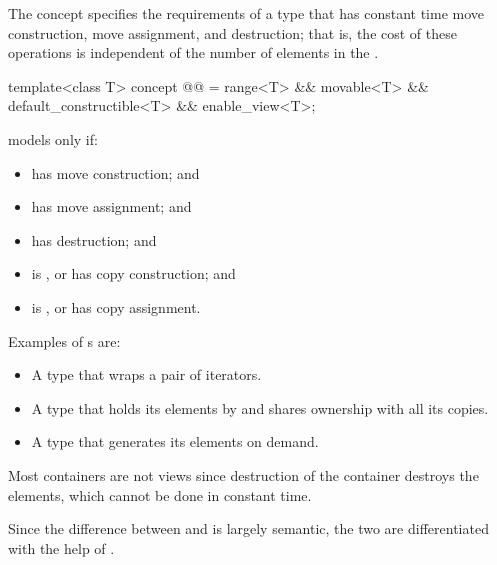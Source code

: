 \pnum
The  concept specifies the requirements of a  type
that has constant time move construction, move assignment, and destruction;
that is, the cost of these operations is
independent of the number of elements in the .

\begin{itemdecl}
template<class T>
  concept @@ =
    range<T> && movable<T> && default_constructible<T> && enable_view<T>;
\end{itemdecl}

\begin{itemdescr}
\pnum
{} models  only if:
\begin{itemize}
\item
{} has  move construction; and

\item
{} has  move assignment; and

\item
{} has  destruction; and

\item
{} is , or
 has  copy construction; and

\item
{} is , or
 has  copy assignment.
\end{itemize}

\pnum
\begin{example}
Examples of s are:
\begin{itemize}
\item A  type that wraps a pair of iterators.

\item A  type that holds its elements by 
and shares ownership with all its copies.

\item A  type that generates its elements on demand.
\end{itemize}

Most containers are not views since
destruction of the container destroys the elements,
which cannot be done in constant time.
\end{example}
\end{itemdescr}

\pnum
Since the difference between  and  is largely
semantic, the two are differentiated with the help of .

